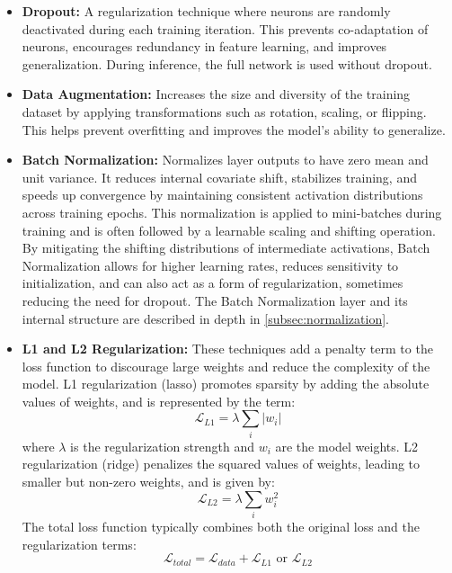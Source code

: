 \begin{itemize}
  \item \textbf{Dropout:} \autocite{10.5555/2627435.2670313} A regularization technique where neurons are randomly deactivated during each training iteration. This prevents co-adaptation of neurons, encourages redundancy in feature learning, and improves generalization. During inference, the full network is used without dropout.

  \item \textbf{Data Augmentation:} \autocite{10.1145/3510413} Increases the size and diversity of the training dataset by applying transformations such as rotation, scaling, or flipping. This helps prevent overfitting and improves the model's ability to generalize.

  \item \textbf{Batch Normalization:} \autocite{NEURIPS2018_36072923} \autocite{10.1145/3510413} Normalizes layer outputs to have zero mean and unit variance. It reduces internal covariate shift, stabilizes training, and speeds up convergence by maintaining consistent activation distributions across training epochs. This normalization is applied to mini-batches during training and is often followed by a learnable scaling and shifting operation. By mitigating the shifting distributions of intermediate activations, Batch Normalization allows for higher learning rates, reduces sensitivity to initialization, and can also act as a form of regularization, sometimes reducing the need for dropout. The Batch Normalization layer and its internal structure are described in depth in \autoref{subsec:normalization}.

  \item \textbf{L1 and L2 Regularization:} \autocite{kukačka2017regularizationdeeplearningtaxonomy} These techniques add a penalty term to the loss function to discourage large weights and reduce the complexity of the model. L1 regularization (lasso) promotes sparsity by adding the absolute values of weights, and is represented by the term:
    \[
      \mathcal{L}_{L1} = \lambda \sum_{i} |w_i|
    \]
    where \( \lambda \) is the regularization strength and \( w_i \) are the model weights. L2 regularization (ridge) penalizes the squared values of weights, leading to smaller but non-zero weights, and is given by:
    \[
      \mathcal{L}_{L2} = \lambda \sum_{i} w_i^2
    \]
    The total loss function typically combines both the original loss and the regularization terms:
    \[
      \mathcal{L}_{total} = \mathcal{L}_{data} + \mathcal{L}_{L1} \text{ or } \mathcal{L}_{L2}
    \]
\end{itemize}

